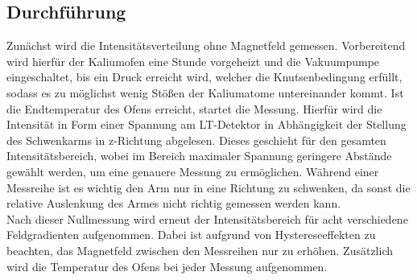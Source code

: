 \subsection{Durchführung}
\label{sec:durchführung}
Zunächst wird die Intensitätsverteilung ohne Magnetfeld gemessen.
Vorbereitend wird hierfür der Kaliumofen eine Stunde vorgeheizt und die Vakuumpumpe eingeschaltet, bis ein Druck erreicht wird, welcher die Knutsenbedingung erfüllt, sodass es zu möglichst wenig Stößen der Kaliumatome untereinander kommt.
Ist die Endtemperatur des Ofens erreicht, startet die Messung.
Hierfür wird die Intensität in Form einer Spannung am LT-Detektor in Abhängigkeit der Stellung des Schwenkarms in z-Richtung abgelesen.
Dieses geschieht für den gesamten Intensitätsbereich, wobei im Bereich maximaler Spannung geringere Abstände gewählt werden, um eine genauere Messung zu ermöglichen.
Während einer Messreihe ist es wichtig den Arm nur in eine Richtung zu schwenken, da sonst die relative Auslenkung des Armes nicht richtig gemessen werden kann.\\
Nach dieser Nullmessung wird erneut der Intensitätsbereich für acht verschiedene Feldgradienten aufgenommen.
Dabei ist aufgrund von Hystereseeffekten zu beachten, das Magnetfeld zwischen den Messreihen nur zu erhöhen.
Zusätzlich wird die Temperatur des Ofens bei jeder Messung aufgenommen.

